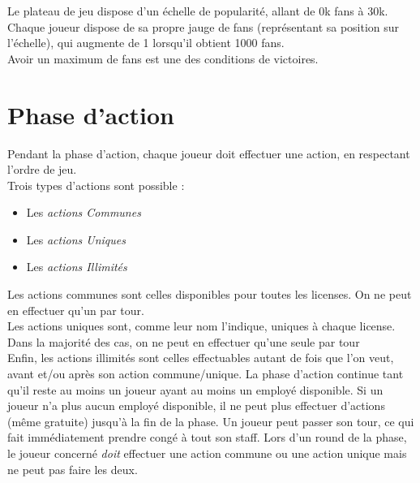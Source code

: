             Le plateau de jeu dispose d'un échelle de popularité, allant de 0k fans à 30k.
            Chaque joueur dispose de sa propre jauge de fans (représentant sa position sur l'échelle),
            qui augmente de 1 lorsqu'il obtient 1000 fans.
            \\
            Avoir un maximum de fans est une des conditions de victoires.



        \section{Phase d'action}

            Pendant la phase d'action, chaque joueur doit effectuer une action, en respectant l'ordre de jeu.
            \\
            Trois types d'actions sont possible :
            \begin{itemize}
                \item Les \textit{actions Communes}
                \item Les \textit{actions Uniques}
                \item Les \textit{actions Illimités}
            \end{itemize}

            Les actions communes sont celles disponibles pour toutes les licenses.
            On ne peut en effectuer qu'un par tour.
            \\
            Les actions uniques sont, comme leur nom l'indique, uniques à chaque license.
            Dans la majorité des cas, on ne peut en effectuer qu'une seule par tour
            \\
            Enfin, les actions illimités sont celles effectuables autant de fois que
            l'on veut, avant et/ou après son action commune/unique.
            \newline
            La phase d'action continue tant qu'il reste au moins un joueur ayant au moins un employé disponible.
            Si un joueur n'a plus aucun employé disponible, il ne peut plus effectuer d'actions (même gratuite)
            jusqu'à la fin de la phase.
            Un joueur peut passer son tour, ce qui fait immédiatement prendre congé à tout son staff.
            \newline
            Lors d'un round de la phase, le joueur concerné \emph{doit} effectuer une action commune
            ou une action unique mais ne peut pas faire les deux.

